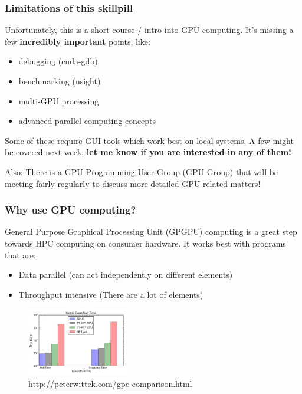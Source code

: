 \documentclass{beamer}
\begin{document}
\begin{frame}
\frametitle{Limitations of this skillpill}
Unfortunately, this is a short course / intro into GPU computing. It's missing a few \textbf{incredibly important} points, like:
\begin{itemize}
\item debugging (cuda-gdb)
\item benchmarking (nsight)
\item multi-GPU processing
\item advanced parallel computing concepts
\end{itemize}
\pause
Some of these require GUI tools which work best on local systems. A few might be covered next week, \textbf{let me know if you are interested in any of them!}

\pause
\vspace{0.5cm}
Also: There is a GPU Programming User Group (GPU Group) that will be meeting fairly regularly to discuss more detailed GPU-related matters!
\end{frame}


\begin{frame}
\frametitle{Why use GPU computing?}

General Purpose Graphical Processing Unit (GPGPU) computing is a great step towards HPC computing on consumer hardware. It works best with programs that are:
\begin{itemize}
\item Data parallel (can act independently on different elements)
\item Throughput intensive (There are a lot of elements)
\end{itemize}

\begin{figure}
\begin{center}
\includegraphics[width=0.4\textwidth]{GPUE_BENCHMARKS.jpg}
\end{center}
\caption{\url{http://peterwittek.com/gpe-comparison.html}}
\end{figure}
\end{frame}
\end{document}
